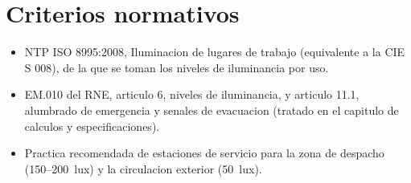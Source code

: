 \section{Criterios normativos}
\begin{itemize}
\item NTP ISO 8995:2008, Iluminacion de lugares de trabajo (equivalente a la
  CIE S 008), de la que se toman los niveles de iluminancia por uso.
\item EM.010 del RNE, articulo 6, niveles de iluminancia, y articulo 11.1,
  alumbrado de emergencia y senales de evacuacion (tratado en el capitulo de
  calculos y especificaciones).
\item Practica recomendada de estaciones de servicio para la zona de despacho
  (150--200~lux) y la circulacion exterior (50~lux).
\end{itemize}

